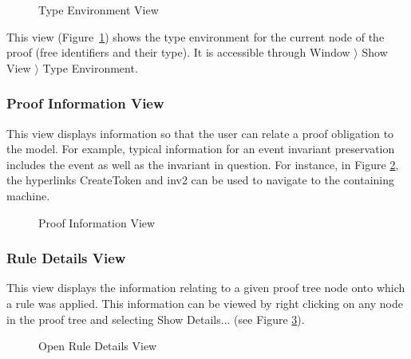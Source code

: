 \begin{figure}[!ht]
\begin{center}
	\caption{Type Environment View}
	\label{fig_ref_01_proving_perspective15}
\end{center}
\end{figure}

This view (Figure~\ref{fig_ref_01_proving_perspective15}) shows the type environment for the current node of the proof (free identifiers and their type). It is accessible through \textsf{Window} $ \rangle $ \textsf{Show View} $ \rangle $ \textsf{Type Environment}.

\subsubsection{Proof Information View}

This view displays information so that the user can relate a proof obligation to the model. For example, typical information for an event invariant preservation includes the event as well as the invariant in question. For instance, in Figure \ref{fig_ref_01_proving_perspective8}, the hyperlinks \textsf{CreateToken} and \textsf{inv2} can be used to navigate to the containing machine. 

\begin{figure}[!ht]
\begin{center}
	\caption{Proof Information View}
	\label{fig_ref_01_proving_perspective8}
\end{center}
\end{figure}

\subsubsection{Rule Details View}

This view displays the information relating to a given proof tree node onto which a rule was applied.
This information can be viewed by right clicking on any node in the proof tree and selecting \textsf{Show Details...} (see Figure \ref{fig_ref_01_proving_perspective9}).

\begin{figure}[!ht]
\begin{center}
	\caption{Open Rule Details View}
	\label{fig_ref_01_proving_perspective9}
\end{center}
\end{figure}

